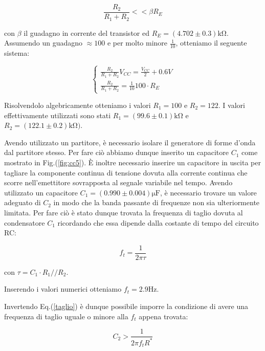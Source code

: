 \begin{equation}
\frac{R_2}{R_1+R_2} <<\beta R_E
\label{partitore2}
\end{equation}

con $\beta$ il guadagno in corrente del transistor ed $R_E=(4.702\pm0.3)\si{\kilo\ohm}$. Assumendo un guadagno $\approx 100$ e per molto minore $\frac{1}{10}$, otteniamo il seguente sistema:

\begin{equation}
\begin{cases}
\frac{R_2}{R_1+R_2} V_{CC}=\frac{V_{CC}}{2} + 0.6V\\
\frac{R_2}{R_1+R_2} =\frac{1}{10} 100 \cdot R_E
\end{cases}
\end{equation}


Risolvendolo algebricamente otteniamo i valori $R_1=100$ e $R_2=122$. I valori effettivamente utilizzati sono stati $R_1=(99.6\pm0.1)\si{\kilo\ohm}$ e $R_2=(122.1\pm0.2) \si{\kilo\ohm})$.

Avendo utilizzato un partitore, è necessario isolare il generatore di forme d'onda dal partitore stesso. Per fare ciò abbiamo dunque inserito un capacitore $C_1$ come mostrato in Fig.(\ref{fig:cc5}).
\`E inoltre necessario inserire un capacitore in uscita per tagliare la componente continua di tensione dovuta alla corrente continua che scorre nell'emettitore sovrapposta al segnale variabile nel tempo. 
Avendo utilizzato un capacitore $C_1=(0.990\pm0.004)\si{\micro\farad}$, è necessario trovare un valore adeguato di $C_2$ in modo che la banda passante di frequenze non sia ulteriormente limitata. Per fare ciò è stato dunque trovata la frequenza di taglio dovuta al condensatore $C_1$ ricordando che essa dipende dalla costante di tempo del circuito RC:

\begin{equation}
f_t=\frac{1}{2\pi \tau} 
\label{taglio}
\end{equation}

con $\tau=C_1 \cdot R_1//R_2$.

Inserendo i valori numerici otteniamo $f_t=2.9 \si{\hertz}$.


Invertendo Eq.(\ref{taglio}) è dunque possibile imporre la condizione di avere una frequenza di taglio uguale o minore alla $f_t$ appena trovata: 

\begin{equation}
C_2>\frac{1}{2\pi f_t R^*}
\end{equation}

